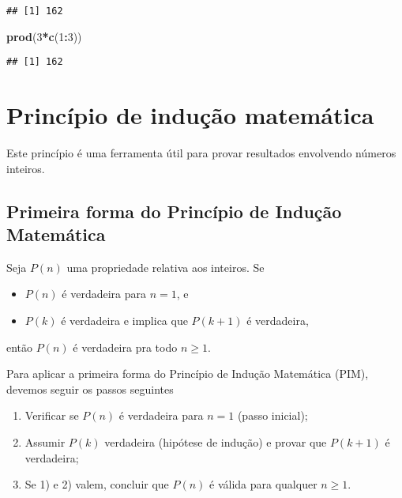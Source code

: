 \documentclass[]{book}
\newenvironment{Shaded}{\begin{snugshade}}{\end{snugshade}}
\newcommand{\DecValTok}[1]{\textcolor[rgb]{0.00,0.00,0.81}{#1}}
\newcommand{\KeywordTok}[1]{\textcolor[rgb]{0.13,0.29,0.53}{\textbf{#1}}}
\newcommand{\NormalTok}[1]{#1}
\newcommand{\OperatorTok}[1]{\textcolor[rgb]{0.81,0.36,0.00}{\textbf{#1}}}
\theoremstyle{definition}
\theoremstyle{definition}
\theoremstyle{definition}
\theoremstyle{remark}
\begin{document}
\begin{verbatim}
## [1] 162
\end{verbatim}

\begin{Shaded}
\begin{Highlighting}[]
\KeywordTok{prod}\NormalTok{(}\DecValTok{3}\OperatorTok{*}\KeywordTok{c}\NormalTok{(}\DecValTok{1}\OperatorTok{:}\DecValTok{3}\NormalTok{))}
\end{Highlighting}
\end{Shaded}

\begin{verbatim}
## [1] 162
\end{verbatim}

\hypertarget{princuxedpio-de-induuxe7uxe3o-matemuxe1tica}{%
\section{Princípio de indução matemática}\label{princuxedpio-de-induuxe7uxe3o-matemuxe1tica}}

Este princípio é uma ferramenta útil para provar resultados envolvendo números inteiros.

\hypertarget{primeira-forma-do-princuxedpio-de-induuxe7uxe3o-matemuxe1tica}{%
\subsection*{Primeira forma do Princípio de Indução Matemática}\label{primeira-forma-do-princuxedpio-de-induuxe7uxe3o-matemuxe1tica}}

Seja \(P(n)\) uma propriedade relativa aos inteiros.
Se

\begin{itemize}
\item
  \(P(n)\) é verdadeira para \(n=1\), e
\item
  \(P(k)\) é verdadeira e implica que \(P(k+1)\) é verdadeira,
\end{itemize}

então \(P(n)\) é verdadeira pra todo \(n \geq 1\).

Para aplicar a primeira forma do Princípio de Indução Matemática (PIM), devemos seguir os passos seguintes

\begin{enumerate}
\def\labelenumi{\arabic{enumi}.}
\item
  Verificar se \(P(n)\) é verdadeira para \(n=1\) (passo inicial);
\item
  Assumir \(P(k)\) verdadeira (hipótese de indução) e provar que \(P(k+1)\) é verdadeira;
\item
  Se 1) e 2) valem, concluir que \(P(n)\) é válida para qualquer \(n \geq 1.\)
\end{enumerate}
\end{document}
